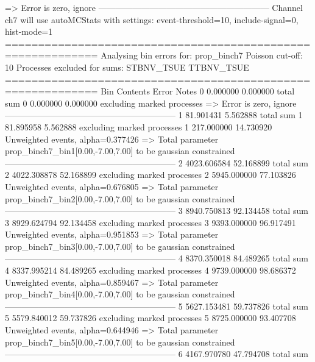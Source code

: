  => Error is zero, ignore      
------------------------------------------------------------
Channel ch7 will use autoMCStats with settings: event-threshold=10, include-signal=0, hist-mode=1
============================================================
Analysing bin errors for: prop_binch7
Poisson cut-off: 10
Processes excluded for sums: STBNV_TSUE TTBNV_TSUE
============================================================
Bin        Contents        Error           Notes                         
0          0.000000        0.000000        total sum                     
0          0.000000        0.000000        excluding marked processes    
  => Error is zero, ignore      
------------------------------------------------------------
1          81.901431       5.562888        total sum                     
1          81.895958       5.562888        excluding marked processes    
1          217.000000      14.730920       Unweighted events, alpha=0.377426
  => Total parameter prop_binch7_bin1[0.00,-7.00,7.00] to be gaussian constrained
------------------------------------------------------------
2          4023.606584     52.168899       total sum                     
2          4022.308878     52.168899       excluding marked processes    
2          5945.000000     77.103826       Unweighted events, alpha=0.676805
  => Total parameter prop_binch7_bin2[0.00,-7.00,7.00] to be gaussian constrained
------------------------------------------------------------
3          8940.750813     92.134458       total sum                     
3          8929.624794     92.134458       excluding marked processes    
3          9393.000000     96.917491       Unweighted events, alpha=0.951853
  => Total parameter prop_binch7_bin3[0.00,-7.00,7.00] to be gaussian constrained
------------------------------------------------------------
4          8370.350018     84.489265       total sum                     
4          8337.995214     84.489265       excluding marked processes    
4          9739.000000     98.686372       Unweighted events, alpha=0.859467
  => Total parameter prop_binch7_bin4[0.00,-7.00,7.00] to be gaussian constrained
------------------------------------------------------------
5          5627.153481     59.737826       total sum                     
5          5579.840012     59.737826       excluding marked processes    
5          8725.000000     93.407708       Unweighted events, alpha=0.644946
  => Total parameter prop_binch7_bin5[0.00,-7.00,7.00] to be gaussian constrained
------------------------------------------------------------
6          4167.970780     47.794708       total sum                     
